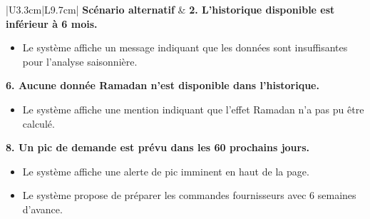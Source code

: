 \documentclass[a4paper,12pt]{report}
\begin{document}
\begin{longtable}{|U{3.3cm}|L{9.7cm}|}
\hline
\textbf{Scénario alternatif} &
\textbf{2. L'historique disponible est inférieur à 6 mois.}
\begin{itemize}
    \item[2.1] Le système affiche un message indiquant que les données sont insuffisantes pour l'analyse saisonnière.
\end{itemize}
\textbf{6. Aucune donnée Ramadan n'est disponible dans l'historique.}
\begin{itemize}
    \item[6.1] Le système affiche une mention indiquant que l'effet Ramadan n'a pas pu être calculé.
\end{itemize}
\textbf{8. Un pic de demande est prévu dans les 60 prochains jours.}
\begin{itemize}
    \item[8.1] Le système affiche une alerte de pic imminent en haut de la page.
    \item[8.2] Le système propose de préparer les commandes fournisseurs avec 6 semaines d'avance.
\end{itemize} 
\end{longtable}
\end{document}
